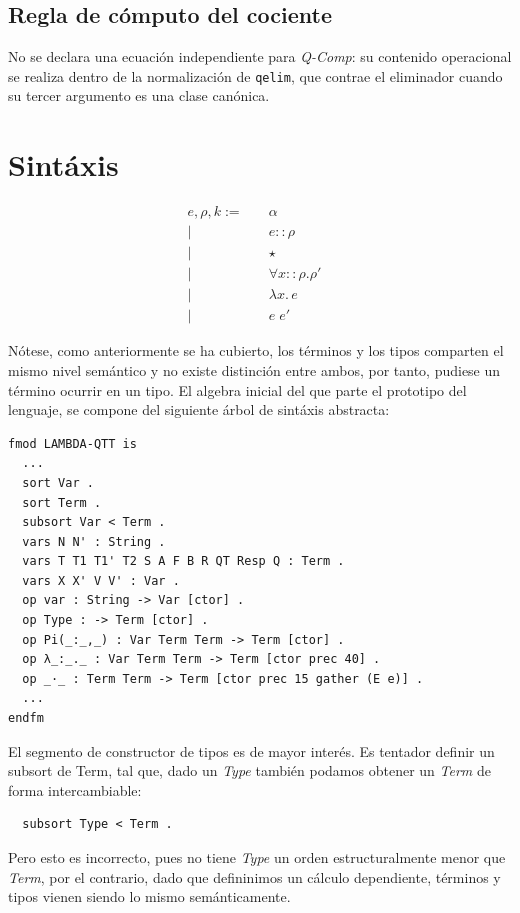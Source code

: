 \subsection{Regla de cómputo del cociente}
No se declara una ecuaci\'on independiente para \emph{Q-Comp}: su contenido operacional se
realiza dentro de la normalizaci\'on de \texttt{qelim}, que contrae el eliminador cuando su
tercer argumento es una clase can\'onica.

\section{Sintáxis}\label{sec:sintaxis}
\begin{align}
e, \rho, k := \quad & \alpha & \tag{1}\\
  \mid \quad & e :: \rho & \tag{2}\\
  \mid \quad & \star \tag{3}\\
  \mid \quad & \forall x::\rho.\rho' \tag{4}\\
  \mid \quad & \lambda x.\, e & \tag{5}\\
  \mid \quad & e \; e' \tag{6}&
\end{align}

Nótese, como anteriormente se ha cubierto, los términos y los tipos comparten el mismo nivel semántico y no existe distinción entre ambos, por tanto, pudiese un término ocurrir en un tipo. El algebra inicial del que parte el prototipo del lenguaje, se compone del siguiente árbol de sintáxis abstracta:
\begin{lstlisting}
fmod LAMBDA-QTT is
  ...
  sort Var .
  sort Term .
  subsort Var < Term .
  vars N N' : String .
  vars T T1 T1' T2 S A F B R QT Resp Q : Term .
  vars X X' V V' : Var .
  op var : String -> Var [ctor] .
  op Type : -> Term [ctor] .
  op Pi(_:_,_) : Var Term Term -> Term [ctor] .
  op λ_:_._ : Var Term Term -> Term [ctor prec 40] .
  op _·_ : Term Term -> Term [ctor prec 15 gather (E e)] .
  ...
endfm
\end{lstlisting}
El segmento de constructor de tipos es de mayor interés. Es tentador definir un subsort de Term, tal que, dado un \textit{Type} también podamos obtener un \textit{Term} de forma intercambiable:
\begin{lstlisting}
  subsort Type < Term .
\end{lstlisting}
Pero esto es incorrecto, pues no tiene \textit{Type} un orden estructuralmente menor que \textit{Term}, por el contrario, dado que defininimos un cálculo dependiente, términos y tipos vienen siendo lo mismo semánticamente.

